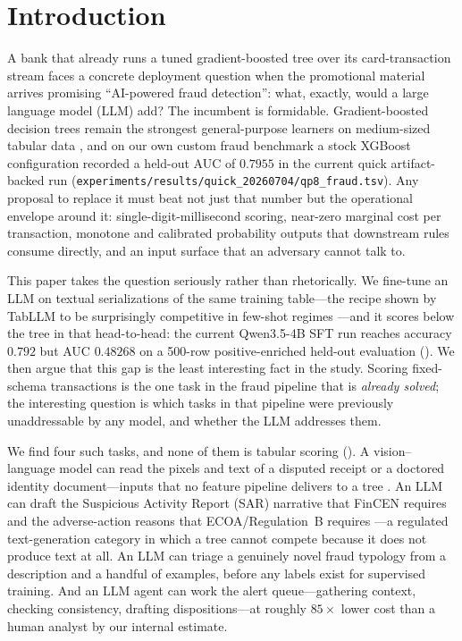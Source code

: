 \section{Introduction}
\label{sec:p8-intro}

A bank that already runs a tuned gradient-boosted tree over its card-transaction
stream faces a concrete deployment question when the promotional material arrives
promising ``AI-powered fraud detection'': what, exactly, would a large language
model (LLM) add? The incumbent is formidable. Gradient-boosted decision trees
remain the strongest general-purpose learners on medium-sized tabular data
\citep{grinsztajn2022tree, shwartzziv2021tabular}, and on our own custom fraud
benchmark a stock XGBoost \citep{chen2016xgboost} configuration recorded a
held-out AUC of $0.7955$ in the current quick artifact-backed run
(\texttt{experiments/results/quick\_20260704/qp8\_fraud.tsv}). Any
proposal to replace it must beat not just that number but the operational
envelope around it: single-digit-millisecond scoring, near-zero marginal cost
per transaction, monotone and calibrated probability outputs that downstream
rules consume directly, and an input surface that an adversary cannot talk to.

This paper takes the question seriously rather than rhetorically. We fine-tune
an LLM on textual serializations of the same training table---the recipe shown
by TabLLM to be surprisingly competitive in few-shot regimes
\citep{hegselmann2023tabllm}---and it scores below the tree in that
head-to-head: the current Qwen3.5-4B SFT run reaches accuracy $0.792$ but AUC
$0.48268$ on a 500-row positive-enriched held-out evaluation
(). We then argue
that this gap is the least interesting fact in the study. Scoring
fixed-schema transactions is the one task in the fraud pipeline that is
\emph{already solved}; the interesting question is which tasks in that pipeline
were previously unaddressable by any model, and whether the LLM addresses them.

We find four such tasks, and none of them is tabular scoring
(). A vision--language model can read the pixels and
text of a disputed receipt or a doctored identity document---inputs that no
feature pipeline delivers to a tree \citep{xu2024fakeshield,
wang2025forensicsbench}. An LLM can draft the Suspicious Activity Report (SAR)
narrative that FinCEN requires and the adverse-action reasons that
ECOA/Regulation~B requires \citep{fincen2003sarnarrative, cfr1002_9}---a
regulated text-generation category in which a tree cannot compete because it
does not produce text at all. An LLM can triage a genuinely novel fraud
typology from a description and a handful of examples, before any labels exist
for supervised training. And an LLM agent can work the alert queue---gathering
context, checking consistency, drafting dispositions---at roughly $85\times$
lower cost than a human analyst by our internal estimate.

